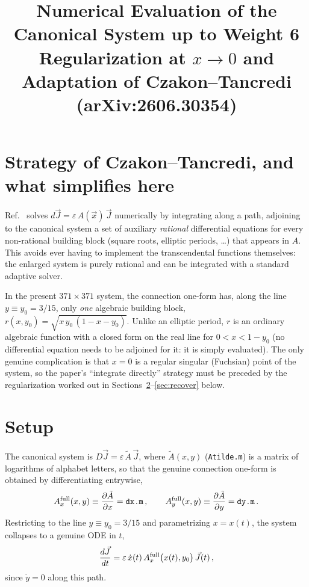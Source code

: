 \documentclass[11pt]{article}
\title{Numerical Evaluation of the Canonical System up to Weight 6\\
\large Regularization at $x\to0$ and Adaptation of Czakon--Tancredi (arXiv:2606.30354)}
\author{}
\date{}
\newcommand{\eps}{\varepsilon}
\newcommand{\Jvec}{\vec J}
\begin{document}
\maketitle

\section{Strategy of Czakon--Tancredi, and what simplifies here}

Ref.~\cite{CzakonTancredi} solves $d\Jvec = \eps\,A(\vec x)\,\Jvec$ numerically by integrating
along a path, adjoining to the canonical system a set of auxiliary \emph{rational} differential
equations for every non-rational building block (square roots, elliptic periods, \ldots) that
appears in $A$. This avoids ever having to implement the transcendental functions themselves: the
enlarged system is purely rational and can be integrated with a standard adaptive solver.

In the present $371\times371$ system, the connection one-form has, along the line $y\equiv y_0=3/15$,
only \emph{one} algebraic building block, $r(x,y_0)=\sqrt{x\,y_0\,(1-x-y_0)}$. Unlike an elliptic
period, $r$ is an ordinary algebraic function with a closed form on the real line for
$0<x<1-y_0$ (no differential equation needs to be adjoined for it: it is simply evaluated). The
only genuine complication is that $x=0$ is a regular singular (Fuchsian) point of the system, so the
paper's ``integrate directly'' strategy must be preceded by the regularization worked out in
Sections~\ref{sec:setup}--\ref{sec:recover} below.

\section{Setup}
\label{sec:setup}

The canonical system is $D\Jvec = \eps\,\tilde A\,\Jvec$, where $\tilde A(x,y)$ (\texttt{Atilde.m}) is a
matrix of logarithms of alphabet letters, so that the genuine connection one-form is obtained by
differentiating entrywise,
\begin{equation}
A_x^{\rm full}(x,y) \equiv \frac{\partial \tilde A}{\partial x} = \texttt{dx.m}\,, \qquad
A_y^{\rm full}(x,y) \equiv \frac{\partial \tilde A}{\partial y} = \texttt{dy.m}\,.
\end{equation}
Restricting to the line $y \equiv y_0 = 3/15$ and parametrizing $x=x(t)$, the system collapses to a
genuine ODE in $t$,
\begin{equation}
\frac{d\Jvec}{dt} = \eps\,\dot x(t)\,A_x^{\rm full}\big(x(t),y_0\big)\,\Jvec(t)\,,
\end{equation}
since $\dot y = 0$ along this path.
\end{document}
